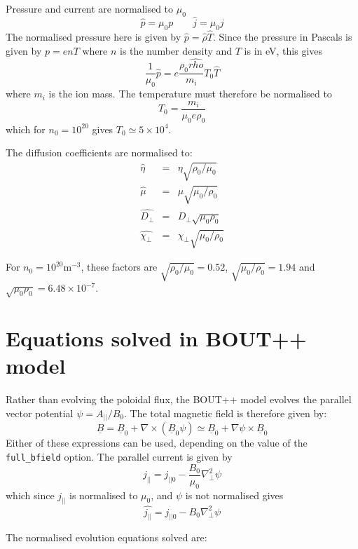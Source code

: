 \documentclass[12pt]{article}
\newcommand{\Bvec}{\ensuremath{\underline{B}}}
\begin{document}
Pressure and current are normalised to $\mu_0$
\[
\hat{p} = \mu_0 p \qquad \hat{j} = \mu_0 j
\]
The normalised pressure here is given by $\hat{p} = \hat{\rho}\hat{T}$.
Since the pressure in Pascals is given by $p = enT$ where $n$ is the number
density and $T$ is in eV, this gives
\[
\frac{1}{\mu_0}\hat{p} = e\frac{\rho_0\hat{rho}}{m_i} T_0\hat{T}
\]
where $m_i$ is the ion mass. The temperature must therefore be normalised to
\[
T_0 = \frac{m_i}{\mu_0 e \rho_0}
\]
which for $n_0=10^{20}$ gives $T_0\simeq 5\times 10^4$.

The diffusion coefficients are normalised to:
\begin{eqnarray*}
\hat{\eta} &=& \eta\sqrt{\rho_0 / \mu_0} \\
\hat{\mu} &=& \mu\sqrt{\mu_0/\rho_0} \\
\hat{D_\perp} &=& D_\perp\sqrt{\mu_0\rho_0} \\
\hat{\chi_\perp} &=& \chi_\perp\sqrt{\mu_0/\rho_0}
\end{eqnarray*}

For $n_0=10^{20}$m$^{-3}$, these factors are $\sqrt{\rho_0 / \mu_0} = 0.52$, $\sqrt{\mu_0/\rho_0}=1.94$ and $\sqrt{\mu_0\rho_0} = 6.48\times 10^{-7}$. 

\section{Equations solved in BOUT++ model}

Rather than evolving the poloidal flux, the BOUT++ model evolves
the parallel vector potential $\psi = A_{||} / B_0$. The total magnetic field
is therefore given by:
\[
\Bvec = \Bvec_0 + \nabla\times\left(\Bvec_0\psi\right) \simeq \Bvec_0 + \nabla\psi \times\Bvec_0
\]
Either of these expressions can be used, depending on the value of the \texttt{full\_bfield} option. The parallel current is given by
\[
j_{||} = j_{||0} - \frac{B_0}{\mu_0}\nabla_\perp^2\psi
\]
which since $j_{||}$ is normalised to $\mu_0$, and $\psi$ is not normalised gives
\[
\hat{j_{||}} = \hat{j_{||0}} - B_0\nabla_\perp^2\psi
\]

The normalised evolution equations solved are:
\end{document}
